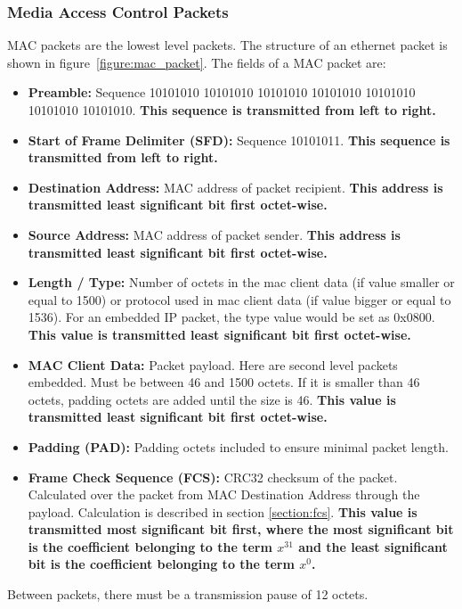 \subsubsection{Media Access Control Packets}
MAC packets are the lowest level packets. The structure of an ethernet packet is shown in figure~\ref{figure:mac_packet}. The fields of a MAC packet are:
\begin{itemize}
  \item \textbf{Preamble:} Sequence 10101010 10101010 10101010 10101010 10101010 10101010 10101010. \textbf{This sequence is transmitted from left to right.}
  \item \textbf{Start of Frame Delimiter (SFD):} Sequence 10101011. \textbf{This sequence is transmitted from left to right.}
  \item \textbf{Destination Address:} MAC address of packet recipient. \textbf{This address is transmitted least significant bit first octet-wise.}
  \item \textbf{Source Address:} MAC address of packet sender. \textbf{This address is transmitted least significant bit first octet-wise.}
  \item \textbf{Length / Type:} Number of octets in the mac client data (if value smaller or equal to 1500) or protocol used in mac client data (if value bigger or equal to 1536). For an embedded IP packet, the type value would be set as 0x0800. \textbf{This value is transmitted least significant bit first octet-wise.}
  \item \textbf{MAC Client Data:} Packet payload. Here are second level packets embedded. Must be between 46 and 1500 octets. If it is smaller than 46 octets, padding octets are added until the size is 46. \textbf{This value is transmitted least significant bit first octet-wise.}
  \item \textbf{Padding (PAD):} Padding octets included to ensure minimal packet length.
  \item \textbf{Frame Check Sequence (FCS):} CRC32 checksum of the packet. Calculated over the packet from MAC Destination Address through the payload. Calculation is described in section \ref{section:fcs}. \textbf{This value is transmitted most significant bit first, where the most significant bit is the coefficient belonging to the term \(x^{31}\) and the least significant bit is the coefficient belonging to the term \(x^0\).}
\end{itemize}

Between packets, there must be a transmission pause of 12 octets.

